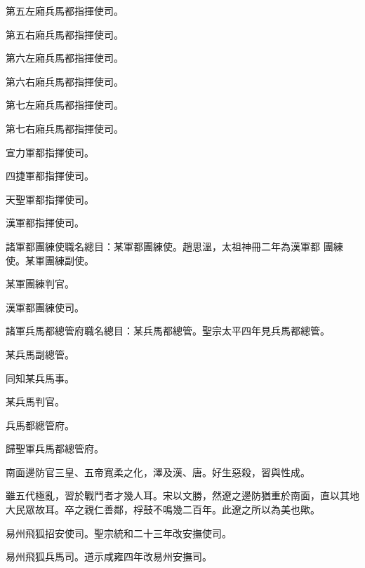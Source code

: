 \begin{pinyinscope}
 第五左廂兵馬都指揮使司。



 第五右廂兵馬都指揮使司。



 第六左廂兵馬都指揮使司。



 第六右廂兵馬都指揮使司。



 第七左廂兵馬都指揮使司。



 第七右廂兵馬都指揮使司。



 宣力軍都指揮使司。



 四捷軍都指揮使司。



 天聖軍都指揮使司。



 漢軍都指揮使司。



 諸軍都團練使職名總目：某軍都團練使。趙思溫，太祖神冊二年為漢軍都
 團練使。某軍團練副使。



 某軍團練判官。



 漢軍都團練使司。



 諸軍兵馬都總管府職名總目：某兵馬都總管。聖宗太平四年見兵馬都總管。



 某兵馬副總管。



 同知某兵馬事。



 某兵馬判官。



 兵馬都總管府。



 歸聖軍兵馬都總管府。



 南面邊防官三皇、五帝寬柔之化，澤及漢、唐。好生惡殺，習與性成。



 雖五代極亂，習於戰鬥者才幾人耳。宋以文勝，然遼之邊防猶重於南面，直以其地大民眾故耳。卒之親仁善鄰，桴鼓不鳴幾二百年。此遼之所以為美也歟。



 易州飛狐招安使司。聖宗統和二十三年改安撫使司。



 易州飛狐兵馬司。道示咸雍四年改易州安撫司。




\end{pinyinscope}

